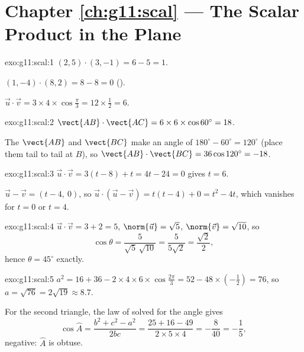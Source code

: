 \section*{Chapter \ref{ch:g11:scal} --- The Scalar Product in the Plane}

\begin{solution}{exo:g11:scal:1}
$(2,5)\cdot(3,-1) = 6 - 5 = 1$.

$(1,-4)\cdot(8,2) = 8 - 8 = 0$ ().

$\vec u\cdot\vec v = 3 \times 4 \times \cos\frac\pi3 = 12 \times \frac12
= 6$.
\end{solution}

\begin{solution}{exo:g11:scal:2}
$\vect{AB}\cdot\vect{AC} = 6 \times 6 \times \cos 60^\circ = 18$.

The  $\vect{AB}$ and $\vect{BC}$ make an angle of
$180^\circ - 60^\circ = 120^\circ$ (place them tail to tail at $B$), so
$\vect{AB}\cdot\vect{BC} = 36 \cos 120^\circ = -18$.
\end{solution}

\begin{solution}{exo:g11:scal:3}
$\vec u \cdot \vec v = 3(t - 8) + t = 4t - 24 = 0$ gives $t = 6$.

$\vec u - \vec v = (t - 4,\ 0)$, so
$\vec u \cdot (\vec u - \vec v) = t(t-4) + 0 = t^2 - 4t$, which vanishes
for $t = 0$ or $t = 4$.
\end{solution}

\begin{solution}{exo:g11:scal:4}
$\vec u \cdot \vec v = 3 + 2 = 5$, $\norm{\vec u} = \sqrt5$,
$\norm{\vec v} = \sqrt{10}$, so
\[
\cos\theta = \frac{5}{\sqrt5\,\sqrt{10}} = \frac{5}{5\sqrt2}
= \frac{\sqrt2}{2},
\]
hence $\theta = 45^\circ$ exactly.
\end{solution}

\begin{solution}{exo:g11:scal:5}
$a^2 = 16 + 36 - 2 \times 4 \times 6 \times \cos\frac{2\pi}{3}
= 52 - 48 \times \left(-\frac12\right) = 76$, so $a = \sqrt{76} =
2\sqrt{19} \approx 8.7$.

For the second triangle, the law of  solved for the angle gives
\[
\cos\widehat A = \frac{b^2 + c^2 - a^2}{2bc}
= \frac{25 + 16 - 49}{2 \times 5 \times 4} = -\frac{8}{40} = -\frac15,
\]
negative: $\widehat A$ is obtuse.
\end{solution}

